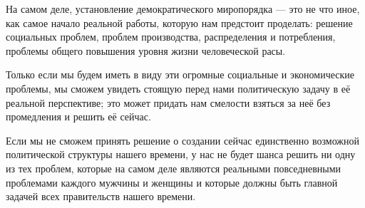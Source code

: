 На самом деле, установление демократического миропорядка — это не что иное, как самое начало реальной работы, которую нам предстоит проделать: решение социальных проблем, проблем производства, распределения и потребления, проблемы общего повышения уровня жизни человеческой расы.
 
Только если мы будем иметь в виду эти огромные социальные и экономические проблемы, мы сможем увидеть стоящую перед нами политическую задачу в её реальной перспективе; это может придать нам смелости взяться за неё без промедления и решить её сейчас.

Если мы не сможем принять решение о создании сейчас единственно возможной политической структуры нашего времени, у нас не будет шанса решить ни одну из тех проблем, которые на самом деле являются реальными повседневными проблемами каждого мужчины и женщины и которые должны быть главной задачей всех правительств нашего времени.

